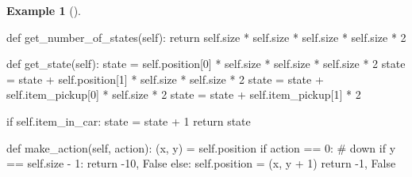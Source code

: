 \documentclass[
  letterpaper,
]{krantz}
\makeatletter
\newenvironment{Shaded}{\begin{snugshade}}{\end{snugshade}}
\newcommand{\CommentTok}[1]{\textcolor[rgb]{0.37,0.37,0.37}{#1}}
\newcommand{\ControlFlowTok}[1]{\textcolor[rgb]{0.00,0.23,0.31}{#1}}
\newcommand{\DecValTok}[1]{\textcolor[rgb]{0.68,0.00,0.00}{#1}}
\newcommand{\KeywordTok}[1]{\textcolor[rgb]{0.00,0.23,0.31}{#1}}
\newcommand{\NormalTok}[1]{\textcolor[rgb]{0.00,0.23,0.31}{#1}}
\newcommand{\OperatorTok}[1]{\textcolor[rgb]{0.37,0.37,0.37}{#1}}
\newcommand{\VariableTok}[1]{\textcolor[rgb]{0.07,0.07,0.07}{#1}}
\newenvironment{kframe}{%
\medskip{}
\setlength{\fboxsep}{.8em}
 \def\at@end@of@kframe{}%
 \ifinner\ifhmode%
  \def\at@end@of@kframe{\end{minipage}}%
  \begin{minipage}{\columnwidth}%
 \fi\fi%
 \def\FrameCommand##1{\hskip\@totalleftmargin \hskip-\fboxsep
 \colorbox{shadecolor}{##1}\hskip-\fboxsep
     \hskip-\linewidth \hskip-\@totalleftmargin \hskip\columnwidth}%
 \MakeFramed {\advance\hsize-\width
   \@totalleftmargin\z@ \linewidth\hsize
   \@setminipage}}%
 {\par\unskip\endMakeFramed%
 \at@end@of@kframe}
\renewenvironment{Shaded}{\begin{kframe}}{\end{kframe}}
\theoremstyle{plain}
\theoremstyle{definition}
\newtheorem{example}{Example}[chapter]
\theoremstyle{definition}
\theoremstyle{remark}
\makeatother
\begin{document}
\begin{example}[]
\begin{tcolorbox}[enhanced jigsaw, bottomrule=.15mm, opacityback=0, breakable, colframe=quarto-callout-tip-color-frame, left=2mm, rightrule=.15mm, toprule=.15mm, leftrule=.75mm, arc=.35mm, colback=white]
\begin{codelisting}[H]
\begin{Shaded}
\begin{Highlighting}[]
    \KeywordTok{def}\NormalTok{ get\_number\_of\_states(}\VariableTok{self}\NormalTok{):}
        \ControlFlowTok{return} \VariableTok{self}\NormalTok{.size }\OperatorTok{*} \VariableTok{self}\NormalTok{.size }\OperatorTok{*} \VariableTok{self}\NormalTok{.size }\OperatorTok{*} \VariableTok{self}\NormalTok{.size }\OperatorTok{*} \DecValTok{2}
    
    \KeywordTok{def}\NormalTok{ get\_state(}\VariableTok{self}\NormalTok{):}
\NormalTok{        state }\OperatorTok{=} \VariableTok{self}\NormalTok{.position[}\DecValTok{0}\NormalTok{] }\OperatorTok{*} \VariableTok{self}\NormalTok{.size }\OperatorTok{*} \VariableTok{self}\NormalTok{.size }\OperatorTok{*} \VariableTok{self}\NormalTok{.size }\OperatorTok{*} \DecValTok{2}
\NormalTok{        state }\OperatorTok{=}\NormalTok{ state }\OperatorTok{+} \VariableTok{self}\NormalTok{.position[}\DecValTok{1}\NormalTok{] }\OperatorTok{*} \VariableTok{self}\NormalTok{.size }\OperatorTok{*} \VariableTok{self}\NormalTok{.size }\OperatorTok{*} \DecValTok{2}
\NormalTok{        state }\OperatorTok{=}\NormalTok{ state }\OperatorTok{+} \VariableTok{self}\NormalTok{.item\_pickup[}\DecValTok{0}\NormalTok{] }\OperatorTok{*} \VariableTok{self}\NormalTok{.size }\OperatorTok{*} \DecValTok{2}
\NormalTok{        state }\OperatorTok{=}\NormalTok{ state }\OperatorTok{+} \VariableTok{self}\NormalTok{.item\_pickup[}\DecValTok{1}\NormalTok{] }\OperatorTok{*} \DecValTok{2}
        
        \ControlFlowTok{if} \VariableTok{self}\NormalTok{.item\_in\_car:}
\NormalTok{            state }\OperatorTok{=}\NormalTok{ state }\OperatorTok{+} \DecValTok{1}
        \ControlFlowTok{return}\NormalTok{ state}
    
    \KeywordTok{def}\NormalTok{ make\_action(}\VariableTok{self}\NormalTok{, action):}
\NormalTok{        (x, y) }\OperatorTok{=} \VariableTok{self}\NormalTok{.position}
        \ControlFlowTok{if}\NormalTok{ action }\OperatorTok{==} \DecValTok{0}\NormalTok{:  }\CommentTok{\# down}
            \ControlFlowTok{if}\NormalTok{ y }\OperatorTok{==} \VariableTok{self}\NormalTok{.size }\OperatorTok{{-}} \DecValTok{1}\NormalTok{:}
                \ControlFlowTok{return} \OperatorTok{{-}}\DecValTok{10}\NormalTok{, }\VariableTok{False}
            \ControlFlowTok{else}\NormalTok{:}
                \VariableTok{self}\NormalTok{.position }\OperatorTok{=}\NormalTok{ (x, y }\OperatorTok{+} \DecValTok{1}\NormalTok{)}
                \ControlFlowTok{return} \OperatorTok{{-}}\DecValTok{1}\NormalTok{, }\VariableTok{False}
        

\end{Highlighting}
\end{Shaded}
\end{codelisting}
\end{tcolorbox}
\end{example}
\end{document}
